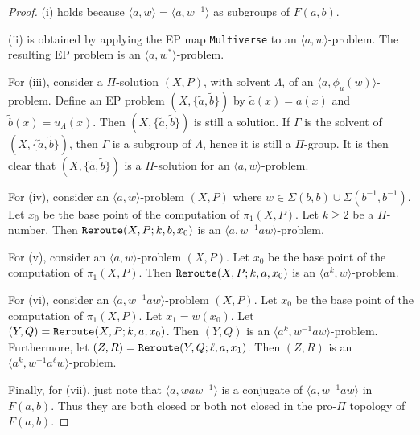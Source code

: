\documentclass[10pt,a4paper]{amsart}
\theoremstyle{definition}
\theoremstyle{definition}
\numberwithin{equation}{section}
\begin{document}
\begin{proof} (i) holds because $\langle a, w\rangle=\langle a, w^{-1}\rangle$ as subgroups of $F(a,b)$. 

(ii) is obtained by applying the EP map {\tt Multiverse} to an $\langle a, w\rangle$-problem. The resulting EP problem is an $\langle a, w^*\rangle$-problem. 

For (iii),  consider a $\Pi$-solution $(X, P)$, with solvent $\Lambda$, of an $\langle a, \phi_u(w)\rangle$-problem. Define an EP problem $(X, \{\tilde{a}, \tilde{b}\})$ by $\tilde{a}(x)=a(x)$ and $\tilde{b}(x)=u_\Lambda(x)$. Then $(X, \{\tilde{a}, \tilde{b}\})$ is still a solution. If $\Gamma$ is the solvent of $(X, \{\tilde{a}, \tilde{b}\})$, then $\Gamma$ is a subgroup of $\Lambda$, hence it is still a $\Pi$-group. It is then clear that $(X, \{\tilde{a}, \tilde{b}\})$ is a $\Pi$-solution for an $\langle a, w\rangle$-problem.

For (iv), consider an $\langle a, w\rangle$-problem $(X, P)$ where $w\in \Sigma(b,b)\cup \Sigma(b^{-1},b^{-1})$. Let $x_0$ be the base point of the computation of $\pi_1(X, P)$. Let $k\geq 2$ be a $\Pi$-number. Then ${\tt Reroute}(X, P; k, b, x_0)$ is an $\langle a, w^{-1}aw\rangle$-problem. 

For (v), consider an $\langle a, w\rangle$-problem $(X, P)$. Let $x_0$ be the base point of the computation of $\pi_1(X, P)$. Then ${\tt Reroute}(X, P; k, a, x_0)$ is an $\langle a^k, w\rangle$-problem. 

For (vi), consider an $\langle a, w^{-1}aw\rangle$-problem $(X, P)$. Let $x_0$ be the base point of the computation of $\pi_1(X, P)$. Let $x_1=w(x_0)$. Let $(Y, Q)={\tt Reroute}(X, P; k, a, x_0)$. Then $(Y, Q)$ is an $\langle a^k, w^{-1}aw\rangle$-problem. Furthermore, let $(Z, R)={\tt Reroute}(Y, Q; \ell, a, x_1)$. Then $(Z, R)$ is an $\langle a^k, w^{-1}a^{\ell}w\rangle$-problem.

Finally, for (vii), just note that $\langle a, waw^{-1}\rangle$ is a conjugate of $\langle a, w^{-1}aw\rangle$ in $F(a, b)$. Thus they are both closed or both not closed in the pro-$\Pi$ topology of $F(a, b)$.
\end{proof}
\end{document}
